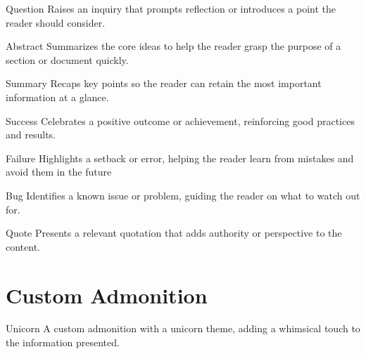 \documentclass[twoside]{article}
\begin{document}
\begin{callout}{Question}
Raises an inquiry that prompts reflection or introduces a point the reader should consider.
\end{callout}
\begin{callout}{Abstract}
Summarizes the core ideas to help the reader grasp the purpose of a section or document quickly.
\end{callout}
\begin{callout}{Summary}
Recaps key points so the reader can retain the most important information at a glance.
\end{callout}
\begin{callout}{Success}
Celebrates a positive outcome or achievement, reinforcing good practices and results.
\end{callout}
\begin{callout}{Failure}
Highlights a setback or error, helping the reader learn from mistakes and avoid them in the future
\end{callout}
\begin{callout}{Bug}
Identifies a known issue or problem, guiding the reader on what to watch out for.
\end{callout}
\begin{callout}{Quote}
Presents a relevant quotation that adds authority or perspective to the content.
\end{callout}
\section*{Custom Admonition}\label{custom-admonition}

\begin{callout}{Unicorn}
A custom admonition with a unicorn theme, adding a whimsical touch to the information presented.
\end{callout}
\end{document}
